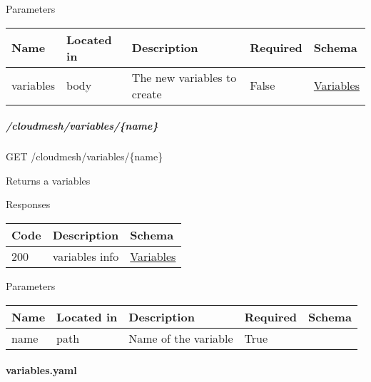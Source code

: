 \documentclass[9pt,]{article}
\let\oldparagraph\paragraph
\renewcommand{\paragraph}[1]{\oldparagraph{#1}\mbox{}}
\let\oldsubparagraph\subparagraph
\renewcommand{\subparagraph}[1]{\oldsubparagraph{#1}\mbox{}}
\begin{document}
Parameters

\begin{longtable}[]{@{}lllll@{}}
\toprule
Name & Located in & Description & Required & Schema\tabularnewline
\midrule
\endhead
variables & body & The new variables to create & False &
\protect\hyperlink{variables}{Variables}\tabularnewline
\bottomrule
\end{longtable}

\hypertarget{cloudmeshvariablesname}{%
\subparagraph{/cloudmesh/variables/\{name\}}\label{cloudmeshvariablesname}}

GET /cloudmesh/variables/\{name\}

Returns a variables

Responses

\begin{longtable}[]{@{}lll@{}}
\toprule
Code & Description & Schema\tabularnewline
\midrule
\endhead
200 & variables info &
\protect\hyperlink{variables}{Variables}\tabularnewline
\bottomrule
\end{longtable}

Parameters

\begin{longtable}[]{@{}lllll@{}}
\toprule
Name & Located in & Description & Required & Schema\tabularnewline
\midrule
\endhead
name & path & Name of the variable & True &\tabularnewline
\bottomrule
\end{longtable}

\hypertarget{variables.yaml}{%
\paragraph{variables.yaml}\label{variables.yaml}}
\end{document}
